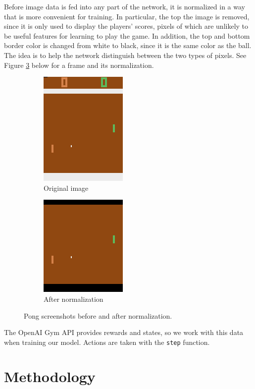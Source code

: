 \documentclass[10pt, twocolumn]{article}
\begin{document}
Before image data is fed into any part of the network, it is normalized in a way that is more convenient for training.
In particular, the top the image is removed, since it is only used to display the players' scores, pixels of which are
unlikely to be useful features for learning to play the game. In addition, the top and bottom border color is changed from
white to black, since it is the same color as the ball. The idea is to help the network distinguish between the two types of pixels.
See Figure \ref{screenshots} below for a frame and its normalization.

\begin{figure}[h]
\centering
\begin{subfigure}[b]{.2\textwidth}
  \centering
  \includegraphics[scale=0.5]{unnormalized}
  \caption{Original image}
  \label{fig:unnormalized}
\end{subfigure} 
\begin{subfigure}[b]{.2\textwidth}
  \centering
  \includegraphics[scale=0.5]{normalized}
  \caption{After normalization}
  \label{fig:normalized}
\end{subfigure} \hfill
\caption{Pong screenshots before and after normalization.}
\label{screenshots}
\end{figure}

The OpenAI Gym API provides rewards and states, so we work with this data when training our model.
Actions are taken with the \verb|step| function.

\section{Methodology}
\end{document}
